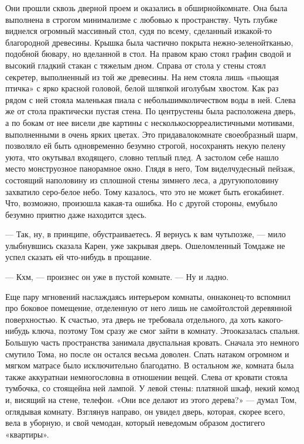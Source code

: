 Они прошли сквозь дверной проем и оказались в обширнойкомнате. Она была выполнена в строгом минимализме с любовью к пространству. Чуть глубже виднелся огромный массивный стол, судя по всему, сделанный изкакой-то благородной древесины. Крышка была частично покрыта нежно-зеленойтканью, подобной бювару, но вделанной в стол. На правом краю стоял графин сводой и высокий гладкий стакан с тяжелым дном. Справа от стола у стены стоял секретер, выполненный из той же древесины. На нем стояла лишь «пьющая птичка» с ярко красной головой, белой шляпкой иголубым хвостом. Как раз рядом с ней стояла маленькая пиала с небольшимколичеством воды в ней. Слева же от стола практически пустая стена. По центрустены была расположена дверь, а по бокам от нее висели две картины с несколькосюрреалистичными мотивами, выполненными в очень ярких цветах. Это придавалокомнате своеобразный шарм, позволяло ей быть одновременно безумно строгой, носохранять некую пелену уюта, что окутывал входящего, словно теплый плед. А застолом себе нашло место монструозное панорамное окно. Глядя в него, Том виделчудесный пейзаж, состоящий наполовину из сплошной стены зимнего леса, а другуюполовину захватило серо-белое небо. Тому казалось, что это не может быть егокабинет. Что, возможно, произошла какая-та ошибка. Но с другой стороны, емубыло безумно приятно даже находится здесь.

— Так, ну, в принципе, обустраиваетесь. Я вернусь к вам чутьпозже, — мило улыбнувшись сказала Карен, уже закрывая дверь. Ошеломленный Томдаже не успел сказать ей что-нибудь в прощание.

— Кхм, — произнес он уже в пустой комнате. — Ну и ладно.

Еще пару мгновений наслаждаясь интерьером комнаты, оннаконец-то вспомнил про боковое помещение, отделенную от него лишь не самойтолстой деревянной поверхностью. К счастью, эта дверь не требовала отдельного, да хоть какого-нибудь ключа, поэтому Том сразу же смог зайти в комнату. Этооказалась спальня. Большую часть пространства занимала двуспальная кровать. Сначала это немного смутило Тома, но после он остался весьма доволен. Спать натаком огромном и мягком матрасе было исключительно благодатно. В остальном же, комната была также аккуратнаи немногословна в отношении вещей. Слева от кровати стояла тумбочка, со стоящейна ней лампой. У левой стены: платяной шкаф, некий комод и, висящий на стене, телефон. «Они все делают из этого дерева?» — думал Том, оглядывая комнату. Взглянув направо, он увидел дверь, которая, скорее всего, вела в уборную, и свой чемодан, который неведомым образом достигего «квартиры».

